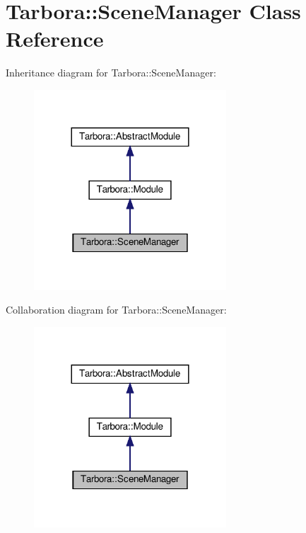 \hypertarget{classTarbora_1_1SceneManager}{}\section{Tarbora\+:\+:Scene\+Manager Class Reference}
\label{classTarbora_1_1SceneManager}


Inheritance diagram for Tarbora\+:\+:Scene\+Manager\+:
\nopagebreak
\begin{figure}[H]
\begin{center}
\leavevmode
\includegraphics[width=204pt]{classTarbora_1_1SceneManager__inherit__graph}
\end{center}
\end{figure}


Collaboration diagram for Tarbora\+:\+:Scene\+Manager\+:
\nopagebreak
\begin{figure}[H]
\begin{center}
\leavevmode
\includegraphics[width=204pt]{classTarbora_1_1SceneManager__coll__graph}
\end{center}
\end{figure}
